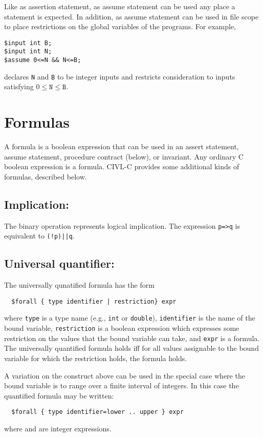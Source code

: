 Like as assertion statement, as assume statement can be used any place
a statement is expected.  In addition, as assume statement can be used
in file scope to place restrictions on the global variables of the
programs.  For example,
\begin{verbatim}
$input int B;
$input int N;
$assume 0<=N && N<=B;
\end{verbatim}
declares \texttt{N} and \texttt{B} to be integer inputs and restricts
consideration to inputs satisfying $0\leq\texttt{N}\leq\texttt{B}$.


\section{Formulas}

A formula is a boolean expression that can be used in an assert
statement, assume statement, procedure contract (below), or invariant.
Any ordinary C boolean expression is a formula. CIVL-C provides some
additional kinds of formulas, described below.

\subsection{Implication: \cimplies}

The binary operation \cimplies{} represents logical implication.
The expression \verb!p=>q! is equivalent to \verb~(!p)||q~.

\subsection{Universal quantifier: \cforall}

The universally qunatified formula has the form
\begin{verbatim}
  $forall { type identifier | restriction} expr
\end{verbatim}
where \verb!type! is a type name (e.g., \texttt{int} or
\texttt{double}), \verb!identifier! is the name of the bound variable,
\verb!restriction! is a boolean expression which expresses some
restriction on the values that the bound variable can take, and
\verb!expr! is a formula.  The universally quantified formula
holds iff for all values assignable to the bound variable
for which the restriction holds, the formula  holds.

A variation on the construct above can be used in the special case
where the bound variable is to range over a finite interval
of integers.  In this case the quantified formula may be written:
\begin{verbatim}
  $forall { type identifier=lower .. upper } expr
\end{verbatim}
where  and  are integer expressions.

